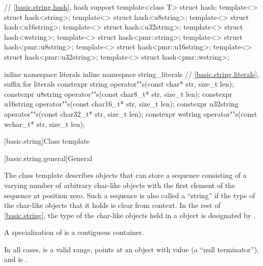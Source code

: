 \begin{codeblock}
{  // \ref{basic.string.hash}, hash support
  template<class T> struct hash;
  template<> struct hash<string>;
  template<> struct hash<u8string>;
  template<> struct hash<u16string>;
  template<> struct hash<u32string>;
  template<> struct hash<wstring>;
  template<> struct hash<pmr::string>;
  template<> struct hash<pmr::u8string>;
  template<> struct hash<pmr::u16string>;
  template<> struct hash<pmr::u32string>;
  template<> struct hash<pmr::wstring>;

  inline namespace literals {
  inline namespace string_literals {
    // \ref{basic.string.literals}, suffix for  literals
    constexpr string    operator""s(const char* str, size_t len);
    constexpr u8string  operator""s(const char8_t* str, size_t len);
    constexpr u16string operator""s(const char16_t* str, size_t len);
    constexpr u32string operator""s(const char32_t* str, size_t len);
    constexpr wstring   operator""s(const wchar_t* str, size_t len);
  }
  }
}
\end{codeblock}

[basic.string]{Class template }

[basic.string.general]{General}

\pnum
{}%
The
class template
describes objects that can store a sequence consisting of a varying number of
arbitrary char-like objects with the first element of the sequence at position zero.
Such a sequence is also called a ``string'' if the type of the
char-like objects that it holds
is clear from context.
In the rest of \ref{basic.string},
the type of the char-like objects held in a  object
is designated by .

\pnum
A specialization of  is a contiguous container.

\pnum
In all cases,
 is a valid range,
 points at an object with value 
(a ``null terminator''),
and  is .


